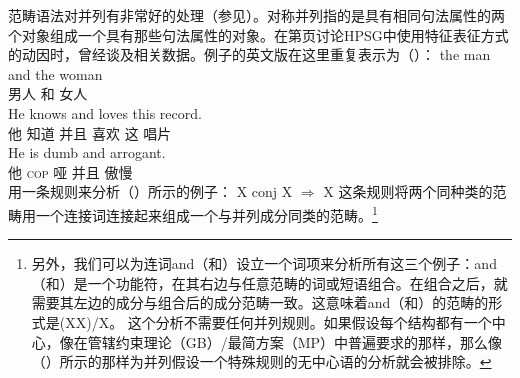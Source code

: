 \begin{exe}
\begin{xlist}[iv.]
\begin{exe}
\begin{xlist}[iv.]
范畴语法对并列有非常好的处理（参见\citet{Steedman91a}）。对称并列指的是具有相同句法属性的两个对象组成一个具有那些句法属性的对象。在第\pageref{Seite-HPSG-Koordination}页讨论HPSG中使用特征表征方式的动因时，曾经谈及相关数据。例子的英文版在这里重复表示为（）：
\eal
\ex 
\gll the man and the woman\\
      男人 和  女人\\
\ex 
\gll He knows and loves this record.\\
     他 知道 并且 喜欢 这 唱片\\
\ex 
\gll He is dumb and arrogant.\\
     他 \textsc{cop} 哑 并且  傲慢\\
\zl
 \citet{Steedman91a}用一条规则来分析（）所示的例子：
\ea
X conj X $\Rightarrow$ X
\z
这条规则将两个同种类的范畴用一个连接词连接起来组成一个与并列成分同类的范畴。\footnote{%
另外，我们可以为连词and（和）设立一个词项来分析所有这三个例子：and（和）是一个功能符，在其右边与任意范畴的词或短语组合。在组合之后，就需要其左边的成分与组合后的成分范畴一致。这意味着and（和）的范畴的形式是(X\bs X)/X。
这个分析不需要任何并列规则。如果假设每个结构都有一个中心，像在\indexgb 管辖约束理论（GB）/最简方案（MP）\indexmp 中普遍要求的那样，那么像（）所示的那样为并列假设一个特殊规则的无中心语的分析就会被排除。
}

\end{xlist}
\end{exe}
\end{xlist}
\end{exe}
